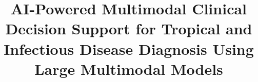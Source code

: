 \documentclass[conference,a4paper,english]{IEEEtran}[2015/08/26]
\begin{document}

\title{AI-Powered Multimodal Clinical Decision Support for Tropical and Infectious Disease Diagnosis Using Large Multimodal Models}

\author{
}

\maketitle

%
%

\end{document}
